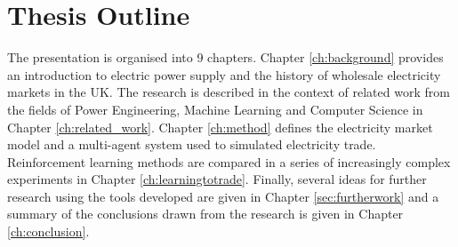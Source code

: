 \section{Thesis Outline}
The presentation is organised into 9 chapters.  Chapter \ref{ch:background}
provides an introduction to electric power supply and the history of wholesale
electricity markets in the UK.  The research is described in
the context of related work from the fields of Power Engineering, Machine
Learning and Computer Science in Chapter \ref{ch:related_work}.  Chapter
\ref{ch:method} defines the electricity market model and a multi-agent system
used to simulated electricity trade.  Reinforcement learning methods are
compared in a series of increasingly complex experiments in Chapter
\ref{ch:learningtotrade}.  Finally, several ideas for further research using
the tools developed are given in Chapter \ref{sec:furtherwork} and a summary
of the conclusions drawn from the research is given in Chapter
\ref{ch:conclusion}.




